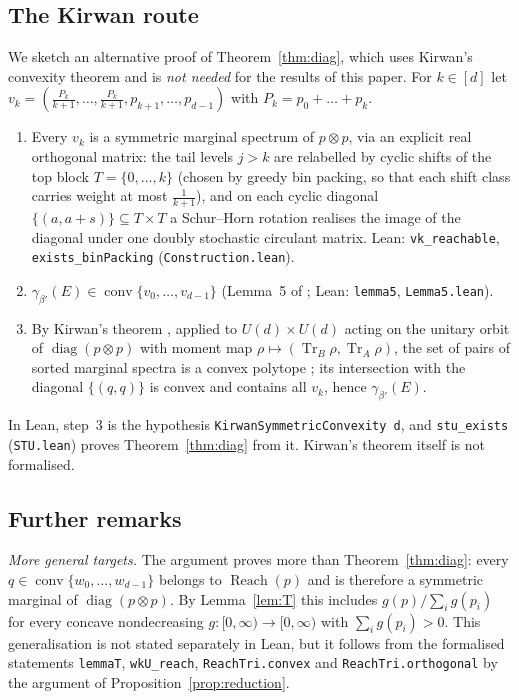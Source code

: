 \documentclass[11pt]{amsart}
\theoremstyle{definition}
\theoremstyle{remark}
\numberwithin{equation}{section}
\newcommand{\Tr}{\operatorname{Tr}}
\newcommand{\diag}{\operatorname{diag}}
\newcommand{\conv}{\operatorname{conv}}
\newcommand{\Reach}{\operatorname{Reach}}
\newcommand{\lean}[1]{\texttt{#1}}
\begin{document}
\subsection{The Kirwan route}\label{sec:kirwan}
We sketch an alternative proof of Theorem~\ref{thm:diag}, which uses Kirwan's convexity theorem and is
\emph{not needed} for the results of this paper. For $k\in[d]$ let
$v_k=(\frac{P_k}{k+1},\dots,\frac{P_k}{k+1},p_{k+1},\dots,p_{d-1})$ with $P_k=p_0+\dots+p_k$.
\begin{enumerate}
\item Every $v_k$ is a symmetric marginal spectrum of $p\otimes p$, via an explicit real orthogonal
matrix: the tail levels $j>k$ are relabelled by cyclic shifts of the top block $T=\{0,\dots,k\}$ (chosen
by greedy bin packing, so that each shift class carries weight at most $\frac1{k+1}$), and on each cyclic
diagonal $\{(a,a+s)\}\subseteq T\times T$ a Schur--Horn rotation realises the image of the diagonal
under one doubly stochastic circulant matrix. Lean: \lean{vk\_reachable}, \lean{exists\_binPacking}
(\lean{Construction.lean}).
\item $\gamma_{\beta'}(E)\in\conv\{v_0,\dots,v_{d-1}\}$ (Lemma~5 of \cite{BakhshinezhadEtAl2019}; Lean:
\lean{lemma5}, \lean{Lemma5.lean}).
\item By Kirwan's theorem \cite{Kirwan1984}, applied to $U(d)\times U(d)$ acting on the unitary orbit of
$\diag(p\otimes p)$ with moment map $\rho\mapsto(\Tr_B\rho,\Tr_A\rho)$, the set of pairs of sorted marginal
spectra is a convex polytope \cite{Klyachko2004,ChristandlMitchison2006}; its intersection with the
diagonal $\{(q,q)\}$ is convex and contains all $v_k$, hence $\gamma_{\beta'}(E)$.
\end{enumerate}
In Lean, step~3 is the hypothesis \lean{KirwanSymmetricConvexity d}, and \lean{stu\_exists}
(\lean{STU.lean}) proves Theorem~\ref{thm:diag} from it. Kirwan's theorem itself is not formalised.

\subsection{Further remarks}
\emph{More general targets.} The argument proves more than Theorem~\ref{thm:diag}: every
$q\in\conv\{w_0,\dots,w_{d-1}\}$ belongs to $\Reach(p)$ and is therefore a symmetric marginal of
$\diag(p\otimes p)$. By Lemma~\ref{lem:T} this includes $g(p)/\sum_ig(p_i)$ for every concave nondecreasing
$g:[0,\infty)\to[0,\infty)$ with $\sum_ig(p_i)>0$. This generalisation is not stated separately in Lean,
but it follows from the formalised statements \lean{lemmaT}, \lean{wkU\_reach}, \lean{ReachTri.convex}
and \lean{ReachTri.orthogonal} by the argument of Proposition~\ref{prop:reduction}.
\end{document}
